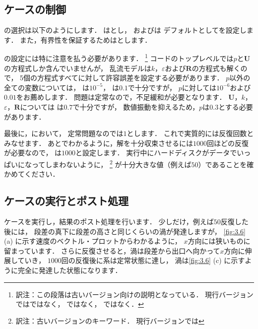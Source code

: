\subsection{ケースの制御}
\label{ssec:3.2.4}
の選択は以下のようにします．
はとし，
およびは
デフォルトとしてを設定します．
また，有界性を保証するためはとします．

の設定には特に注意を払う必要があります．%
\footnote{訳注：この段落は古いバージョン向けの説明となっている．
現行バージョンではではなく，
ではなく，
ではなく．}%
コードのトップレベルでは$p$と$\bm{U}$の方程式しか含んでいませんが，
乱流モデルは$k$，$\varepsilon$および$\bm{R}$の方程式も解くので，
5個の方程式すべてに対して許容誤差を設定する必要があります．
$p$以外の全ての変数については，
は$10^{-5}$，
は$0.1$で十分ですが，
$p$に対しては$10^{-6}$および$0.01$をお薦めします．
問題は定常なので，不足緩和が必要となります．
$\bm{U}$，$k$，$\varepsilon$，$\bm{R}$については
は$0.7$で十分ですが，
数値振動を抑えるため，$p$は$0.3$とする必要があります．

最後に，において，
定常問題なのでは$1$とします．
これで実質的には反復回数とみなせます．
あとでわかるように，解を十分収束させるには$1000$回ほどの反復が必要なので，
は$1000$と設定します．
実行中にハードディスクがデータでいっぱいになってしまわないように，
%
\footnote{訳注：古いバージョンのキーワード．
現行バージョンでは}%
が十分大きな値（例えば$50$）であることを確かめてください．


\subsection{ケースの実行とポスト処理}
\label{ssec:3.2.5}
ケースを実行し，結果のポスト処理を行います．
少しだけ，例えば$50$反復した後には，
段差の真下に段差の高さと同じくらいの渦が発達しますが，
\autoref{fig:3.6} (a) に示す速度のベクトル・プロットからわかるように，
$x$方向には狭いものに留まっています．
さらに反復させると，渦は段差から出口へ向かって$x$方向に伸展していき，
$1000$回の反復後に系は定常状態に達し，
渦は\autoref{fig:3.6} (c) に示すように完全に発達した状態になります．



